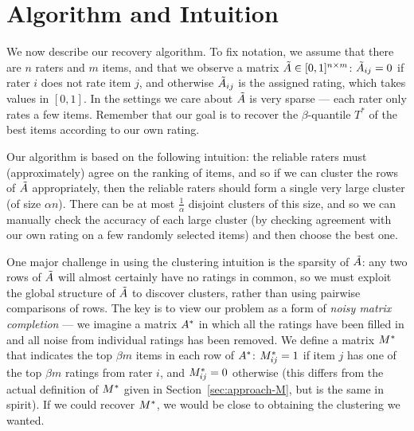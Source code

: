 \section{Algorithm and Intuition}
\label{sec:algorithm}



We now describe our recovery algorithm. To fix notation, we assume that 
there are $n$ raters and $m$ items, and that we observe a matrix 
$\tilde{A} \in [0,1]^{n \times m}$: 
$\tilde{A}_{ij} = 0$ if rater $i$ does not rate item $j$, and otherwise $\tilde{A}_{ij}$ 
is the assigned rating, which takes values 
in $[0,1]$. In the settings we 
care about $\tilde{A}$ is very sparse --- each rater only rates a few items.
Remember that our goal is to recover the $\beta$-quantile $T^*$ of the 
best items according to our own rating. 

Our algorithm is based on the following intuition: the reliable raters must 
(approximately) agree on the ranking of items, and so if we can cluster the 
rows of $\tilde{A}$ appropriately, then the reliable raters should form a single very large cluster 
(of size $\alpha n$). There can be at most $\frac{1}{\alpha}$ disjoint clusters of this size, and 
so we can manually check the accuracy of each large cluster (by checking agreement 
with our own rating on a few randomly selected items) and 
then choose the best one.

One major challenge in using the clustering intuition is the sparsity of 
$\tilde{A}$: any two rows of $\tilde{A}$ will almost certainly have no ratings in common, 
so we must exploit the global structure of $\tilde{A}$ to discover 
clusters, rather than using pairwise comparisons of rows.
The key is to view our problem as a form of \emph{noisy matrix completion} --- 
we imagine a matrix $A^*$ in which all the ratings have been filled in 
and all noise from individual ratings has been removed. We define a 
matrix $M^*$ that indicates the top $\beta m$ items in each row of $A^*$: 
$M^*_{ij} = 1$ if item $j$ has one of the top $\beta m$ ratings from rater $i$, 
and $M^*_{ij} = 0$ otherwise (this differs from the actual 
definition of $M^*$ given in Section~\ref{sec:approach-M}, but is the same in spirit). If we could recover $M^*$, we would be 
close to obtaining the clustering we wanted.

